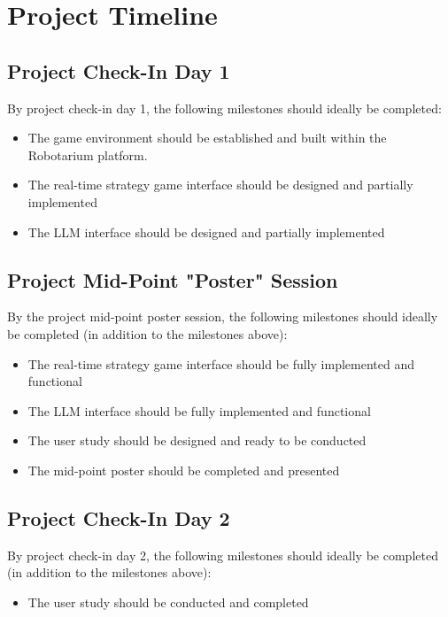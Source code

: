 \section{Project Timeline}

\subsection{Project Check-In Day 1}

By project check-in day 1, the following milestones should ideally be completed:
\begin{itemize}[noitemsep, topsep=0pt]
    \item The game environment should be established and built within the Robotarium platform.
    \item The real-time strategy game interface should be designed and partially implemented
    \item The LLM interface should be designed and partially implemented
\end{itemize}

\subsection{Project Mid-Point "Poster" Session}

By the project mid-point poster session, the following milestones should ideally be completed (in addition to the milestones above):
\begin{itemize}[noitemsep, topsep=0pt]
    \item The real-time strategy game interface should be fully implemented and functional
    \item The LLM interface should be fully implemented and functional
    \item The user study should be designed and ready to be conducted
    \item The mid-point poster should be completed and presented
\end{itemize}

\subsection{Project Check-In Day 2}

By project check-in day 2, the following milestones should ideally be completed (in addition to the milestones above):
\begin{itemize}[noitemsep, topsep=0pt]
    \item The user study should be conducted and completed
\end{itemize}

